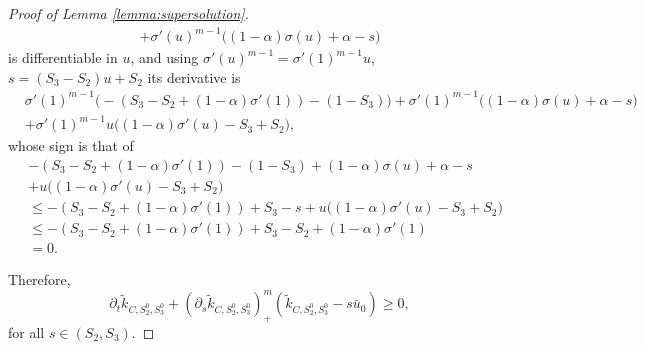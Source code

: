 \documentclass[11pt]{article}
\numberwithin{equation}{section} %
\newcommand{\p}{{\partial}}
\newcommand{\al}{\alpha}
\begin{document}
\begin{proof}[Proof of Lemma \ref{lemma:supersolution}]
\begin{multline*}
    + \sigma'(u)^{m-1} \big( (1-\al) \sigma(u) + \al - s \big)
\end{multline*}
is differentiable in $u$, and using  $\sigma'(u)^{m-1} = \sigma'(1)^{m-1} u$, $s= (S_3 - S_2) u + S_2$ its derivative is 
\begin{align*}
    &\sigma'(1)^{m-1}   \big( - (S_3-S_2 + (1-\al)\sigma'(1)) - (1-S_3)\big) 
    + \sigma'(1)^{m-1} \big( (1-\al) \sigma(u) + \al - s \big) \\
    &+ \sigma'(1)^{m-1}u \big( (1-\al) \sigma'(u) - S_3+S_2 \big),
\end{align*}
whose sign is that of
\begin{align*}
     &  - (S_3-S_2 + (1-\al)\sigma'(1)) - (1-S_3) 
    +  (1-\al) \sigma(u) + \al - s  \\
    &+ u \big( (1-\al) \sigma'(u) - S_3+S_2 \big)\\
    &\le  - (S_3-S_2 + (1-\al)\sigma'(1)) +S_3- s  
    + u \big( (1-\al) \sigma'(u) - S_3+S_2 \big) \\
    &\le  - (S_3-S_2 + (1-\al)\sigma'(1)) + S_3-S_2 + (1-\al)\sigma'(1) \\
    &= 0.
\end{align*}

Therefore, 
\begin{equation*}
    \p_t \tilde k_{C,S_2^0,S_3^0} + (\p_s \tilde k_{C,S_2^0,S_3^0})^m_+ (\tilde k_{C,S_2^0,S_3^0}-s\bar u_0) \ge 0,
\end{equation*}
for all $s\in (S_2, S_3)$.


\end{proof}
\end{document}
